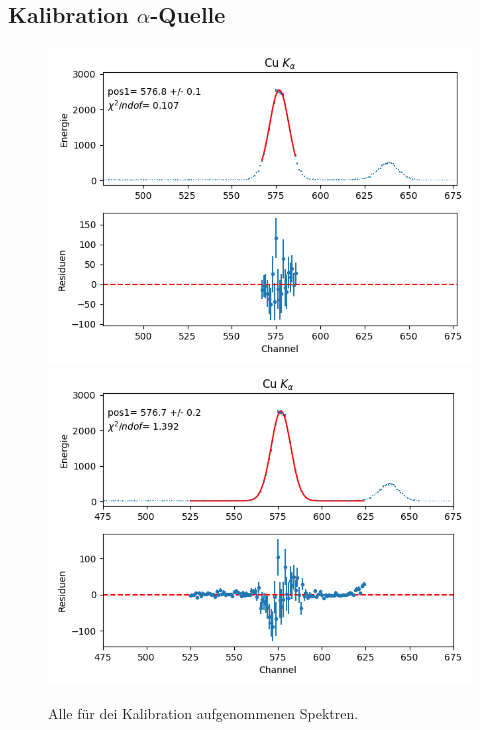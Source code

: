 \documentclass[12pt,a4paper]{article}
\begin{document}
\subsection{Kalibration $\alpha$-Quelle}
\begin{figure}[H]
\centering
\includegraphics[scale=0.8]{Bilder/alpha/cu_alpha_1.png}
\includegraphics[scale=0.8]{Bilder/alpha/cu_alpha_2.png}
\caption{Alle für dei Kalibration aufgenommenen Spektren.}
\label{fig:kal_alles}
\end{figure}
\end{document}
